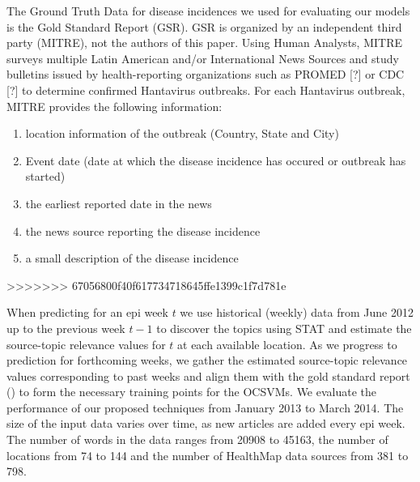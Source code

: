 \documentclass[conference]{IEEEtran}
\newcommand{\model}{{STAT}\xspace} %
\begin{document}
The Ground Truth Data for disease incidences we used for evaluating our models is the Gold Standard Report (GSR). 
GSR is organized by an independent third party (MITRE), not the authors of this 
paper. Using Human Analysts, MITRE surveys multiple Latin American and/or International 
News Sources and study bulletins issued by health-reporting organizations such 
as PROMED [?] or CDC [?] to determine confirmed Hantavirus outbreaks. For each 
Hantavirus outbreak, MITRE provides the following information: 
\begin{enumerate}
  \item location information of the outbreak (Country, State and City)
  \item Event date (date at which the disease incidence has occured or outbreak has started)
  \item the earliest reported date in the news
  \item the news source reporting the disease incidence
  \item a small description of the disease incidence
\end{enumerate}
>>>>>>> 67056800f40f617734718645ffe1399c1f7d781e

When predicting for an epi week $t$ we use historical (weekly) data from June 2012 up to the previous week $t-1$ to discover the topics using \model and estimate the source-topic relevance values for $t$ at each available location. As we progress to prediction for forthcoming weeks, we gather the estimated source-topic relevance values corresponding to past weeks and align them with the gold standard report () to  form the necessary training points for the OCSVMs. We evaluate the performance of our proposed techniques from January 2013 to March 2014. The size of the input data varies over time, as new articles are added every epi week. The number of words in the data ranges from 20908 to 45163, the number of locations from 74 to 144 and the number of HealthMap data sources from 381 to 798.
\end{document}

